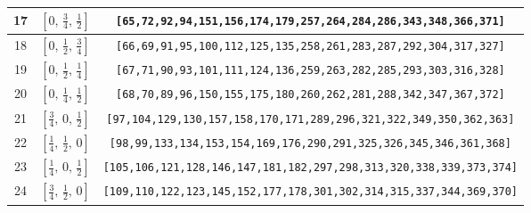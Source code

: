 \documentclass[fleqn,8pt]{jsarticle}
\begin{document}
\begin{longtable}{ccc}
17 & $\left[ 0,\, \frac{3}{4},\, \frac{1}{2} \right]$ & {\tt [65,72,92,94,151,156,174,179,257,264,284,286,343,348,366,371]} \\ \hline
18 & $\left[ 0,\, \frac{1}{2},\, \frac{3}{4} \right]$ & {\tt [66,69,91,95,100,112,125,135,258,261,283,287,292,304,317,327]} \\ \hline
19 & $\left[ 0,\, \frac{1}{2},\, \frac{1}{4} \right]$ & {\tt [67,71,90,93,101,111,124,136,259,263,282,285,293,303,316,328]} \\ \hline
20 & $\left[ 0,\, \frac{1}{4},\, \frac{1}{2} \right]$ & {\tt [68,70,89,96,150,155,175,180,260,262,281,288,342,347,367,372]} \\ \hline
21 & $\left[ \frac{3}{4},\, 0,\, \frac{1}{2} \right]$ & {\tt [97,104,129,130,157,158,170,171,289,296,321,322,349,350,362,363]} \\ \hline
22 & $\left[ \frac{1}{4},\, \frac{1}{2},\, 0 \right]$ & {\tt [98,99,133,134,153,154,169,176,290,291,325,326,345,346,361,368]} \\ \hline
23 & $\left[ \frac{1}{4},\, 0,\, \frac{1}{2} \right]$ & {\tt [105,106,121,128,146,147,181,182,297,298,313,320,338,339,373,374]} \\ \hline
24 & $\left[ \frac{3}{4},\, \frac{1}{2},\, 0 \right]$ & {\tt [109,110,122,123,145,152,177,178,301,302,314,315,337,344,369,370]} \\
\end{longtable}
\renewcommand{\arraystretch}{1.2}
\end{document}
